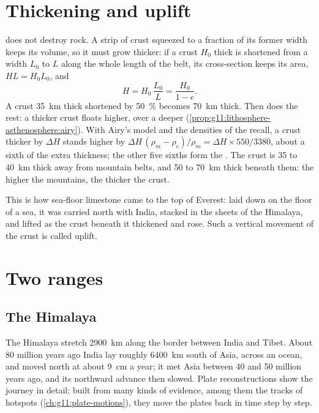 \section{Thickening and uplift}

 does not destroy rock. A strip of crust squeezed to a fraction of
its former width keeps its volume, so it must grow thicker: if a crust
$H_0$ thick is shortened from a width $L_0$ to $L$ along the whole length of
the belt, its cross-section keeps its area, $H L = H_0 L_0$, and
\[
  H = H_0\,\frac{L_0}{L} = \frac{H_0}{1 - e}.
\]
A crust \qty{35}{km} thick shortened by \qty{50}{\percent} becomes
\qty{70}{km} thick. Then  does the rest: a thicker crust floats
higher, over a deeper  (\cref{prop:g11:lithosphere-asthenosphere:airy}).
With Airy's model and the densities of the recall, a crust thicker by
$\Delta H$ stands higher by $\Delta H\,(\rho_m - \rho_c)/\rho_m = \Delta H
\times 550/3380$, about a sixth of the extra thickness; the other five
sixths form the . The crust is \num{35} to \qty{40}{km} thick away from
mountain belts, and 50 to \qty{70}{km} thick beneath them: the higher the
mountains, the thicker the crust.

This is how sea-floor limestone came to the top of Everest: laid down on the
floor of a sea, it was carried north with India, stacked in the 
sheets of the Himalaya, and lifted as the crust beneath it thickened and
rose. Such a vertical movement of the crust is called uplift.

\section{Two ranges}

\subsection{The Himalaya}

The Himalaya stretch \qty{2900}{km} along the border between India and
Tibet. About 80 million years ago India lay roughly \qty{6400}{km} south of
Asia, across an ocean, and moved north at about \qty{9}{cm} a year; it met
Asia between 40 and 50 million years ago, and its northward advance then
slowed. Plate reconstructions show the journey in detail: built from many
kinds of evidence, among them the tracks of hotspots
(\cref{ch:g11:plate-motions}), they move the plates back in time step by
step.

